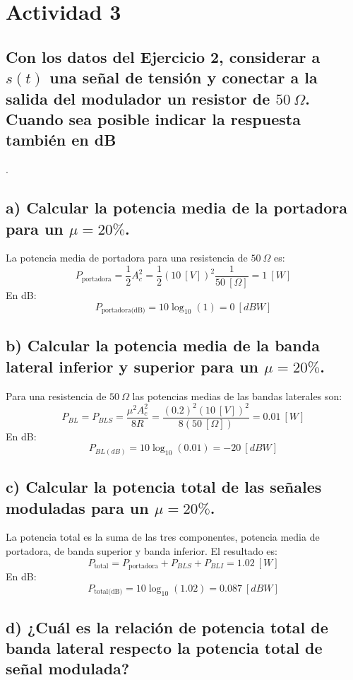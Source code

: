 \section{Actividad 3}

\subsection*{Con los datos del Ejercicio 2, considerar a $s(t)$ una señal de tensión y conectar a la salida del modulador un resistor de $50~\Omega$. Cuando sea posible indicar la respuesta también en dB}.

\subsection*{a) Calcular la potencia media de la portadora para un $\mu = 20\%$.}

La potencia media de portadora para una resistencia de $50~\Omega$ es:
\[
    P_{\text{portadora}} = \frac{1}{2} A_c^2 = \frac{1}{2} \left(10~[V]\right)^2 \frac{1}{50~[\Omega]} = 1~[W]
\]
En dB:
\[
    P_{\text{portadora(dB)}} = 10 \log_{10}(1) = 0~[dBW]
\]

\subsection*{b) Calcular la potencia media de la banda lateral inferior y superior para un $\mu = 20\%$.}

Para una resistencia de $50~\Omega$ las potencias medias de las bandas laterales son:
\[
    P_{BL} = P_{BLS} = \frac{\mu^2 A_c^2}{8R} = \frac{(0.2)^2 (10~[V])^2}{8(50~[\Omega])} = 0.01~[W]
\]
En dB:
\[
    P_{BL(dB)} = 10 \log_{10}(0.01) = -20~[dBW]
\]

\subsection*{c) Calcular la potencia total de las señales moduladas para un $\mu = 20\%$.}

La potencia total es la suma de las tres componentes, potencia media de portadora, de banda superior y banda inferior. El resultado es:
\[
    P_{\text{total}} = P_{\text{portadora}} + P_{BLS} + P_{BLI} = 1.02~[W]
\]
En dB:
\[
    P_{\text{total(dB)}} = 10 \log_{10}(1.02) = 0.087~[dBW]
\]

\subsection*{d) ¿Cuál es la relación de potencia total de banda lateral respecto la potencia total de señal modulada?}

